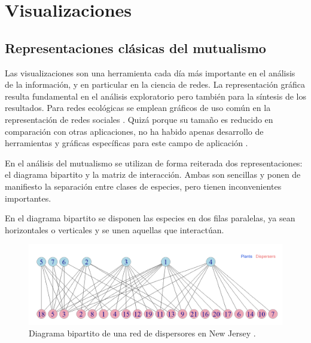 
\chapter{Visualizaciones} %

\label{VISUALIZACIÓN} %


\section{Representaciones clásicas del mutualismo}

Las visualizaciones son una herramienta cada día más importante en el análisis de la información, y en particular en la ciencia de redes. La representación gráfica resulta fundamental en el análisis exploratorio pero también para la síntesis de los resultados. Para redes ecológicas se emplean gráficos de uso común en la representación de redes sociales \cite{freeman2012social}. Quizá porque su tamaño es reducido en comparación con otras aplicaciones, no ha habido apenas desarrollo de herramientas y gráficas específicas para este campo de aplicación \cite{yoon20043d, kazanci2007econet}.

En el análisis del mutualismo se utilizan de forma reiterada dos representaciones: el diagrama bipartito y la matriz de interacción. Ambas  son sencillas y ponen de manifiesto la separación entre clases de especies, pero tienen inconvenientes importantes. 

En el diagrama bipartito se disponen las especies en dos filas paralelas, ya sean horizontales o verticales
y se unen aquellas que interactúan.

\begin{figure}[h!]
\centering
\includegraphics[scale=0.33]{Figures/VIS_bipartito_SD_001.png}
\caption{Diagrama bipartito de una red de dispersores en New Jersey \cite{baird1980selection}.}
\label{fig:VIS_bipartito_SD_001}
\end{figure}

